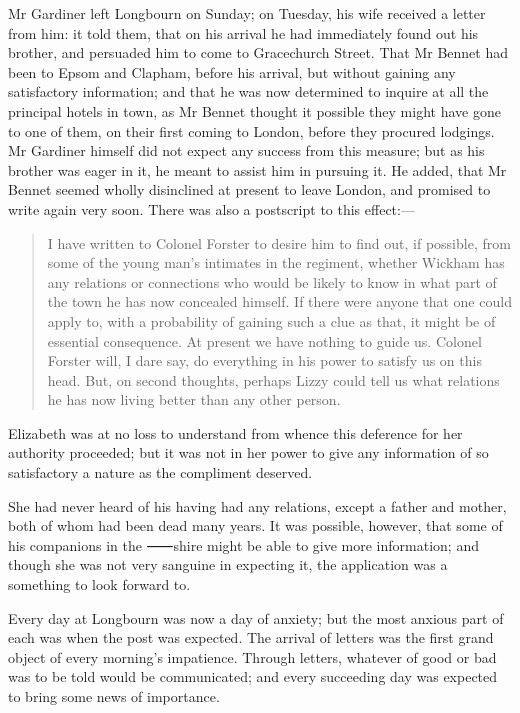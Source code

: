 Mr Gardiner left Longbourn on Sunday; on Tuesday, his wife received a letter from him: it told them, that on his arrival he had immediately found out his brother, and persuaded him to come to Gracechurch Street. That Mr Bennet had been to Epsom and Clapham, before his arrival, but without gaining any satisfactory information; and that he was now determined to inquire at all the principal hotels in town, as Mr Bennet thought it possible they might have gone to one of them, on their first coming to London, before they procured lodgings. Mr Gardiner himself did not expect any success from this measure; but as his brother was eager in it, he meant to assist him in pursuing it. He added, that Mr Bennet seemed wholly disinclined at present to leave London, and promised to write again very soon. There was also a postscript to this effect:—

\begin{quote}
I have written to Colonel Forster to desire him to find out, if possible, from some of the young man's intimates in the regiment, whether Wickham has any relations or connections who would be likely to know in what part of the town he has now concealed himself. If there were anyone that one could apply to, with a probability of gaining such a clue as that, it might be of essential consequence. At present we have nothing to guide us. Colonel Forster will, I dare say, do everything in his power to satisfy us on this head. But, on second thoughts, perhaps Lizzy could tell us what relations he has now living better than any other person.
\end{quote}

Elizabeth was at no loss to understand from whence this deference for her authority proceeded; but it was not in her power to give any information of so satisfactory a nature as the compliment deserved.

She had never heard of his having had any relations, except a father and mother, both of whom had been dead many years. It was possible, however, that some of his companions in the ⸺shire might be able to give more information; and though she was not very sanguine in expecting it, the application was a something to look forward to.

Every day at Longbourn was now a day of anxiety; but the most anxious part of each was when the post was expected. The arrival of letters was the first grand object of every morning's impatience. Through letters, whatever of good or bad was to be told would be communicated; and every succeeding day was expected to bring some news of importance.

